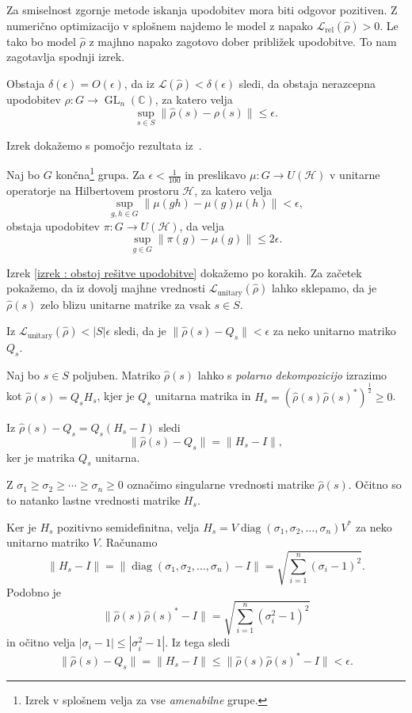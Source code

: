 \documentclass[mat2, tisk]{fmfdelo}
\newcommand{\loss}{\mathcal L}
\newcommand{\Loss}[1]{\mathcal L _\text{#1}}
\newcommand{\C}{\mathbb C}
\newcommand{\s}{\hat \rho (s)}
\begin{document}
Za smiselnost zgornje metode iskanja upodobitev mora biti
odgovor pozitiven.
Z numerično optimizacijo v splošnem najdemo
le model z napako $\Loss{rel}(\hat \rho) > 0$.
Le tako bo model $\hat \rho$ z majhno napako zagotovo dober
približek upodobitve.
To nam zagotavlja spodnji izrek.
%
\begin{izrek}
  \label{izrek : obstoj rešitve upodobitve}
  Obstaja $\delta(\epsilon) = O(\epsilon)$, da iz
  $
  \loss(\hat \rho) < \delta(\epsilon)
  $
  sledi, da
  obstaja nerazcepna upodobitev $\rho \colon G \to
  \operatorname{GL}_n(\C) $, za katero velja
  $$
  \sup_{s \in S} \|\hat \rho(s) - \rho(s) \| \leq \epsilon.
  $$
\end{izrek}
Izrek dokažemo s pomočjo rezultata iz~\cite[Theorem II.5 na
strani 7]{gamm2011epsilonrepresentations}.
\begin{izrek}[Kazhdan]
  \label{izrek : kazhdan}
  Naj bo $G$ končna\footnote{Izrek v splošnem velja za vse
  \emph{amenabilne} grupe.} grupa.
  Za $\epsilon < \frac{1}{100}$ in preslikavo
  $\mu \colon G \to U(\mathcal H)$ v unitarne operatorje na
  Hilbertovem prostoru $\mathcal H$, za katero velja
  $$
  \sup_{g,h \in G} \|\mu(gh) - \mu(g)\mu(h)\| < \epsilon,
  $$
  obstaja upodobitev $\pi \colon G \to U(\mathcal H)$, da velja
  $$
  \sup_{g \in G} \|\pi(g) - \mu(g) \| \leq 2\epsilon.
  $$
\end{izrek}
Izrek \ref{izrek : obstoj rešitve upodobitve} dokažemo po korakih.
Za začetek pokažemo, da iz dovolj majhne vrednosti
$\Loss{unitary}(\hat \rho)$ lahko sklepamo, da je
$\hat \rho(s)$ zelo blizu unitarne matrike za vsak
$s \in S$.
\begin{lema}
  \label{lema:rho_s - Q_s < eps}
  Iz  $\Loss{unitary}(\hat \rho) < |S|\epsilon $ sledi, da je
  $\|\hat \rho(s) - Q_s\| < \epsilon$ za neko unitarno matriko
  $Q_s$.
\end{lema}
\begin{dokaz}
  Naj bo $s \in S$ poljuben. Matriko $\hat\rho(s)$ lahko s
  \emph{polarno dekompozicijo} izrazimo kot
  $\s = Q_s H_s$, kjer je $Q_s$ unitarna matrika in $H_s = (\s
  \s ^*)^\frac{1}{2} \geq 0$.

  Iz $\s - Q_s = Q_s(H_s-I)$ sledi
  $$
  \|\s - Q_s\| = \|H_s - I\|,
  $$
  ker je matrika $Q_s$ unitarna.

  Z $\sigma_1 \geq \sigma_2 \geq \dotsm \geq \sigma_n \geq 0$
  označimo singularne vrednosti matrike $\s$. Očitno
  so to natanko lastne vrednosti matrike $H_s$.

  Ker je $H_s$ pozitivno semidefinitna, velja
  $H_s = V \operatorname{diag}(\sigma_1, \sigma_2, \dotsc, \sigma_n) V^*$
  za neko unitarno matriko $V$.
  Računamo
  $$
  \|H_s - I\| = \|\operatorname{diag}(\sigma_1, \sigma_2,
  \dotsc, \sigma_n)  - I\|
  = \sqrt{\sum_{i=1}^n (\sigma_i -1)^2}.
  $$
  Podobno je
  $$
  \|\s \s^* - I\| = \sqrt{\sum_{i=1}^n (\sigma_i^2 -1)^2}
  $$
  in očitno velja
  $
  |\sigma_i -1| \leq |\sigma_i^2 -1|
  $.
  Iz tega sledi
  $$
  \|\s - Q_s\| = \|H_s - I\| \leq \|\s \s^* - I\| < \epsilon.
  $$

\end{dokaz}
\end{document}
